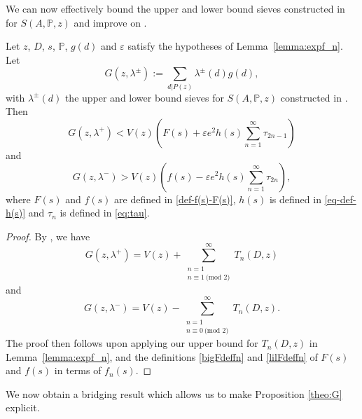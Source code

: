 \documentclass[12pt]{amsart}
\begin{document}
We can now effectively bound the upper and lower bound sieves constructed in \cite[Theorem 9.3]{Nathanson} for $S(A,\mathbb{P}, z)$ and improve on \cite[Theorem 9.6]{Nathanson}.
\begin{prop}
\label{theo:G}
Let $z$, $D$, $s$, $\mathbb{P}$, $g(d)$ and $\varepsilon$ satisfy the hypotheses of Lemma~\ref{lemma:expf_n}. Let
\begin{equation*}
G(z, \lambda^{\pm}):=\sum_{d|P(z)}\lambda^{\pm}(d)g(d),
\end{equation*}
with $\lambda^{\pm}(d)$ the upper and lower bound sieves for $S(A,\mathbb{P}, z)$ constructed in \cite[Theorem 9.3]{Nathanson}.
Then
\begin{equation*}
G(z, \lambda^{+})< V(z)\left(F(s)+\varepsilon e^2 h(s) \sum_{n=1}^{\infty}\tau_{2n-1} \right)
\end{equation*}
and 
\begin{equation*}
G(z, \lambda^{-})> V(z)\left(f(s)-\varepsilon e^2 h(s) \sum_{n=1}^{\infty}\tau_{2n} \right),
\end{equation*}
where $F(s)$ and $f(s)$ are defined in \eqref{def-f(s)-F(s)}, $h(s)$ is defined in \eqref{eq-def-h(s)} and $\tau_n$ is defined in \eqref{eq:tau}.
\end{prop}
\begin{proof}
    By \cite[Lemma 9.3]{Nathanson}, we have
    \begin{equation*}
        G(z,\lambda^+)=V(z)+\sum_{\substack{n=1\\ n\equiv 1\ \text{(mod $2$)}}}^\infty T_n(D,z)
    \end{equation*}
    and 
    \begin{equation*}
        G(z,\lambda^-)=V(z)-\sum_{\substack{n=1\\ n\equiv 0\ \text{(mod $2$)}}}^\infty T_n(D,z).
    \end{equation*}
The proof then follows upon applying our upper bound for $T_n(D,z)$ in Lemma~\ref{lemma:expf_n}, and the definitions \eqref{bigFdeffn} and \eqref{lilFdeffn} of $F(s)$ and $f(s)$ in terms of $f_n(s)$.
\end{proof}

 We now obtain a bridging result which allows us to make Proposition \ref{theo:G} explicit.
\end{document}
